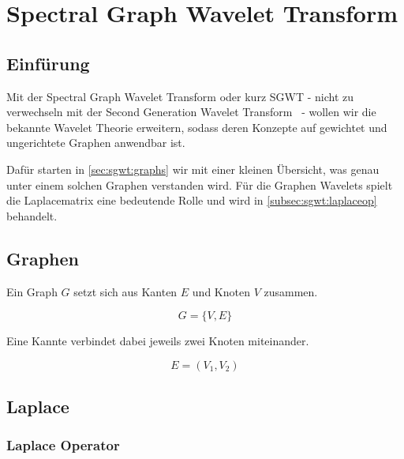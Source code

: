 %
%
%
\chapter{Spectral Graph Wavelet Transform\label{chapter:sgwt}}
\begin{refsection}



\section{Einf\"urung}

Mit der Spectral Graph Wavelet Transform oder kurz SGWT - 
nicht zu verwechseln mit der Second Generation Wavelet 
Transform~\cite{noauthor_second-generation_2018} - wollen wir die bekannte 
Wavelet Theorie erweitern, sodass deren Konzepte auf gewichtet und ungerichtete 
Graphen anwendbar ist.

Daf\"ur starten in \cref{sec:sgwt:graphs} wir mit einer kleinen \"Ubersicht, 
was genau unter einem 
solchen Graphen verstanden wird. F\"ur die Graphen Wavelets spielt die 
Laplacematrix \laplaceL{} eine bedeutende Rolle und wird in 
\cref{subsec:sgwt:laplaceop} behandelt.

\section{Graphen\label{sec:sgwt:graphs}}

Ein Graph $G$ setzt sich aus Kanten $E$ und Knoten $V$ zusammen.

\begin{equation}
G = \{V, E\}
\end{equation}

Eine Kannte verbindet dabei jeweils zwei Knoten miteinander.

\begin{equation}
E = (V_1, V_2)
\end{equation}


\section{Laplace\label{sec:sgwt:laplace}}

\subsection{Laplace Operator\label{subsec:sgwt:laplaceop}}


\end{refsection}
